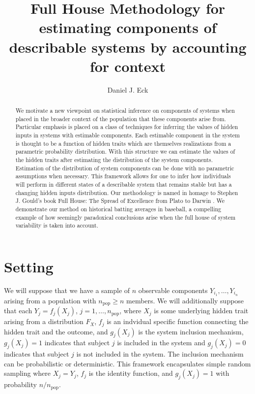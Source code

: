 \documentclass[11pt]{article}
\title{Full House Methodology for estimating components of describable systems by accounting for context}
\author{Daniel J. Eck}
\newcommand{\npop}{n_{\text{pop}}}
\newcommand{\nsys}{n}
\begin{document}
\maketitle

\begin{abstract}
We motivate a new viewpoint on statistical inference on components of systems when placed in the broader context of the population that these components arise from. Particular emphasis is placed on a class of techniques for inferring the values of hidden inputs in systems with estimable components. Each estimable component in the system is thought to be a function of hidden traits which are themselves realizations from a parametric probability distribution. With this structure we can estimate the values of the hidden traits after estimating the distribution of the system components. Estimation of the distribution of system components can be done with no parametric assumptions when necessary. This framework allows for one to infer how individuals will perform in different states of a describable system that remains stable but has a changing hidden inputs  distribution. Our methodology is named in homage to Stephen J. Gould's book Full House: The Spread of Excellence from Plato to Darwin \citep{gould1996full}.  We demonstrate our method on historical batting averages in baseball, a compelling example of how seemingly paradoxical conclusions arise when the full house of system variability is taken into account.
\end{abstract}







\section{Setting}

We will suppose that we have a sample of $\nsys$ observable components $Y_{i_1},\ldots,Y_{i_{\nsys}}$ arising from a population with $\npop \geq \nsys$ members. We will additionally suppose that each $Y_j = f_j(X_j)$, $j = 1,\ldots,\npop$, where $X_j$ is some underlying hidden trait arising from a distribution $F_X$, $f_j$ is an indvidual specific function connecting the hidden trait and the outcome, and $g_j(X_j)$ is the system inclusion mechanism, $g_j(X_j) = 1$ indicates that subject $j$ is included in the system and $g_j(X_j) = 0$ indicates that subject $j$ is not included in the system. The inclusion mechanism can be probabilistic or deterministic. This framework encapsulates simple random sampling where $X_j = Y_j$, $f_j$ is the identity function, and $g_j(X_j) = 1$ with probability $\nsys/\npop$.
\end{document}
